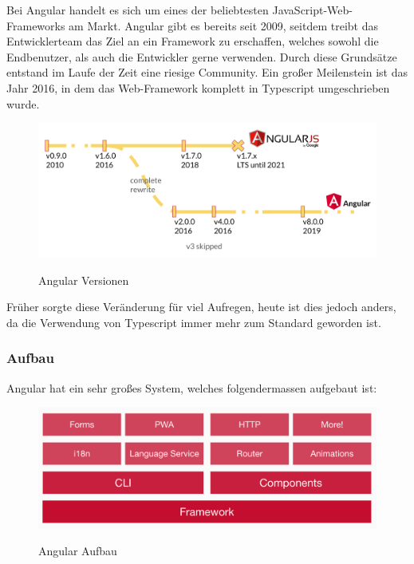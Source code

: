 Bei Angular handelt es sich um eines der beliebtesten JavaScript-Web-Frameworks am Markt. Angular gibt es bereits seit 2009, seitdem treibt das Entwicklerteam das Ziel an ein Framework zu erschaffen, welches sowohl die Endbenutzer, als auch die Entwickler gerne verwenden. Durch diese Grundsätze entstand im Laufe der Zeit eine riesige Community. Ein großer Meilenstein ist das Jahr 2016, in dem das Web-Framework komplett in Typescript umgeschrieben wurde.

\begin{figure}[h!]
    \centering
    \includegraphics[width=1\textwidth]{pics/angular-versions.png}
    \caption{Angular Versionen}
    \cite{frontend_web_angular_introduction}
    \label{fig:mesh1}
\end{figure}

Früher sorgte diese Veränderung für viel Aufregen, heute ist dies jedoch anders, da die Verwendung von Typescript immer mehr zum Standard geworden ist.

\newpage
\subsubsection{Aufbau}
Angular hat ein sehr großes System, welches folgendermassen aufgebaut ist:

\begin{figure}[h!]
    \centering
    \includegraphics[width=1\textwidth]{pics/angular-architecture.png}
    \caption{Angular Aufbau}
    \cite{frontend_web_angular_introduction}
    \label{fig:mesh1}
\end{figure}


